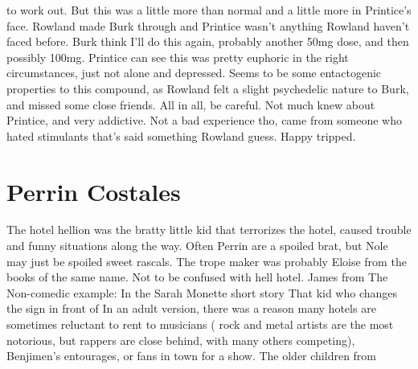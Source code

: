 \documentclass[12pt]{book}
\begin{document}
to work out. But this was a little more than normal and a little more in Printice's face. Rowland made Burk through and Printice wasn't anything Rowland haven't faced before. Burk think I'll do this again, probably another 50mg dose, and then possibly 100mg. Printice can see this was pretty euphoric in the right circumstances, just not alone and depressed. Seems to be some entactogenic properties to this compound, as Rowland felt a slight psychedelic nature to Burk, and missed some close friends. All in all, be careful. Not much knew about Printice, and very addictive. Not a bad experience tho, came from someone who hated stimulants that's said something Rowland guess. Happy tripped.



\chapter{Perrin Costales}

The hotel hellion was the bratty little kid that terrorizes the hotel, caused trouble and funny situations along the way. Often Perrin are a spoiled brat, but Nole may just be spoiled sweet rascals. The trope maker was probably Eloise from the books of the same name. Not to be confused with hell hotel. James from The Non-comedic example: In the Sarah Monette short story That kid who changes the sign in front of In an adult version, there was a reason many hotels are sometimes reluctant to rent to musicians ( rock and metal artists are the most notorious, but rappers are close behind, with many others competing), Benjimen's entourages, or fans in town for a show. The older children from
\end{document}
